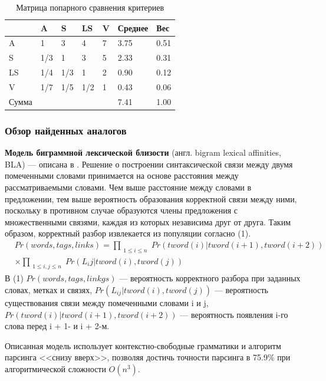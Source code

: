 \begin{table}[H]
\centering
\caption{Матрица попарного сравнения критериев}
{\small 
\begin{tabu}to \textwidth{ | X[c] | X[c] | X[c] | X[c] | X[c] | X[c] | X[c] | }
	\hline
          & A   & S   & LS  & V & Среднее & Вес  \\ \hline
	A     & 1   & 3   & 4   & 7 & 3.75    & 0.51 \\
	S     & 1/3 & 1   & 3   & 5 & 2.33    & 0.31 \\
	LS    & 1/4 & 1/3 & 1   & 2 & 0.90    & 0.12 \\
	V     & 1/7 & 1/5 & 1/2 & 1 & 0.43    & 0.06 \\ \hline
	Сумма &     &     &     &   & 7.41    & 1.00 \\
	\hline
\end{tabu}
}
\label{tab:crit}
\end{table}

\subsubsection{Обзор найденных аналогов}

\textbf{Модель биграммной лексической близости} (англ. bigram lexical affinities, BLA) --- описана в \cite{eisner}. Решение о построении синтаксической связи между двумя помеченными словами принимается на основе расстояния между рассматриваемыми словами. Чем выше расстояние между словами в предложении, тем выше вероятность образования корректной связи между ними, поскольку в противном случае образуются члены предложения с множественными связями, каждая из которых независима друг от друга. Таким образом, корректный разбор извлекается из популяции согласно (1). 
\begin{equation}\begin{split}
	& Pr(words, tags, links) = \prod_{\substack{1 \leq i \leq n}} Pr(tword(i) | tword(i + 1), tword(i + 2)) \\
    & \times\prod_{\substack{1 \leq i, j \leq n}} Pr(L_ij | tword(i), tword(j))
\end{split}\end{equation}
В (1) \(Pr(words, tags, linkgs)\) --- вероятность корректного разбора при заданных словах, метках и связях, \(Pr(L_{ij} | tword(i), tword(j))\) --- вероятность существования связи между помеченными словами i и j, \(Pr(tword(i) | tword(i + 1), tword(i + 2))\) --- вероятность появления i-го слова перед i + 1- и i + 2-м. 

Описанная модель использует контекстно-свободные грамматики и алгоритм парсинга <<снизу вверх>>, позволяя достичь точности парсинга в 75.9\% при алгоритмической сложности \(O(n^3)\).

